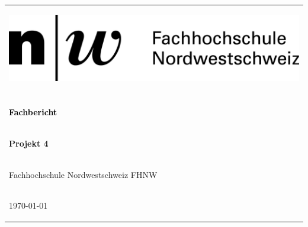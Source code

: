 \thispagestyle{empty}

\begin{center}
\begin{tabular}{p{\textwidth}}

\begin{flushleft}
\includegraphics[scale=1.3]{Bilder/FHNW.png}
\end{flushleft}

\\

\\

\begin{center}
\textcolor{black}{
\textbf{
\Huge{
Fachbericht
}}}
\end{center}

\\

\begin{center}
\Large{
\textbf{
Projekt 4
}}
\end{center}

\\

\begin{center}
\large{
Fachhochschule Nordwestschweiz FHNW
}
\end{center}

\\

\begin{center}
\large{\today}
\end{center}

\vspace*{2cm}


\end{tabular}
\end{center}
